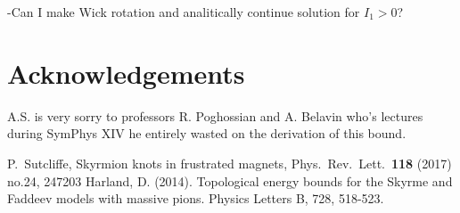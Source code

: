 \documentclass[12pt,a4paper]{article}
\begin{document}
-Can I make Wick rotation and analitically continue solution for $I_1>0$?

\section*{Acknowledgements}
A.S. is very sorry to professors R. Poghossian and A. Belavin who's lectures during SymPhys XIV he entirely wasted on the derivation of this bound.

\begin{small}
\begin{thebibliography}{13}
P.~Sutcliffe, Skyrmion knots in frustrated magnets, 
Phys.\ Rev.\ Lett.\  {\bf 118} (2017) no.24,  247203
Harland, D. (2014). Topological energy bounds for the Skyrme and Faddeev models with massive pions. Physics Letters B, 728, 518-523.

\end{thebibliography}
\end{small}

%
%
\end{document}
